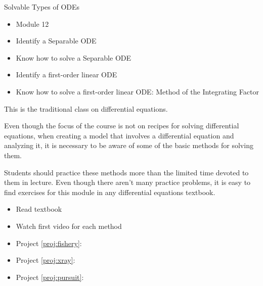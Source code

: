 \begin{module}{Solvable Types of ODEs}

	\label{ODE:solve}

	
	

\end{module}


\begin{lesson}

	\begin{itemize}
		\item Module 12
	\end{itemize}

	\begin{itemize}
		\item Identify a Separable ODE
		\item Know how to solve a Separable ODE
		\item Identify a first-order linear ODE
		\item Know how to solve a first-order linear ODE: Method of the Integrating Factor
	\end{itemize}
	

This is the traditional class on differential equations. 

Even though the focus of the course is not on recipes for solving differential equations, when creating a model that involves a differential equation and analyzing it, it is necessary to be aware of some of the basic methods for solving them. 

Students should practice these methods more than the limited time devoted to them in lecture. Even though there aren't many practice problems, it is easy to find exercises for this module in any differential equations textbook.

\begin{itemize}
	\item Read textbook
	\item Watch first video for each method
\end{itemize}


\begin{itemize}
	\item Project \ref{proj:fishery}: \fisherytitle
	\item Project \ref{proj:xray}: \xraytitle
	\item Project \ref{proj:pursuit}: \pursuittitle
\end{itemize}


\end{lesson}




